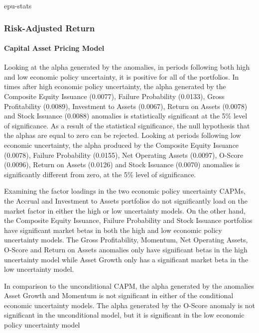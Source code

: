 \documentclass[a4paper,12pt]{article}                 %
\begin{document}
{epu-stats}

\subsubsection{Risk-Adjusted Return}
\paragraph{Capital Asset Pricing Model}
Looking at the alpha generated by the anomalies, in periods following both high and low economic policy uncertainty, it is positive for all of the portfolios. In times after high economic policy uncertainty, the alpha generated by the Composite Equity Issuance (0.0077), Failure Probability (0.0133), Gross Profitability (0.0089), Investment to Assets (0.0067), Return on Assets (0.0078) and Stock Issuance (0.0088) anomalies is statistically significant at the 5\% level of significance. As a result of the statistical significance, the null hypothesis that the alphas are equal to zero can be rejected. Looking at periods following low economic uncertainty, the alpha produced by the Composite Equity Issuance (0.0078), Failure Probability (0.0155), Net Operating Assets (0.0097), O-Score (0.0096), Return on Assets (0.0126) and Stock Issuance (0.0070) anomalies is significantly different from zero, at the 5\% level of significance. 

Examining the factor loadings in the two economic policy uncertainty CAPMs, the Accrual and Investment to Assets portfolios do not significantly load on the market factor in either the high or low uncertainty models. On the other hand, the Composite Equity Issuance, Failure Probability and Stock Issuance portfolios have significant market betas in both the high and low economic policy uncertainty models. The Gross Profitability, Momentum, Net Operating Assets, O-Score and Return on Assets anomalies only have significant betas in the high uncertainty model while Asset Growth only has a significant market beta in the low uncertainty model.

In comparison to the unconditional CAPM, the alpha generated by the anomalies Asset Growth and Momentum is not significant in either of the conditional economic uncertainty models. The alpha generated by the O-Score anomaly is not significant in the unconditional model, but it is significant in the low economic policy uncertainty model
\end{document}
